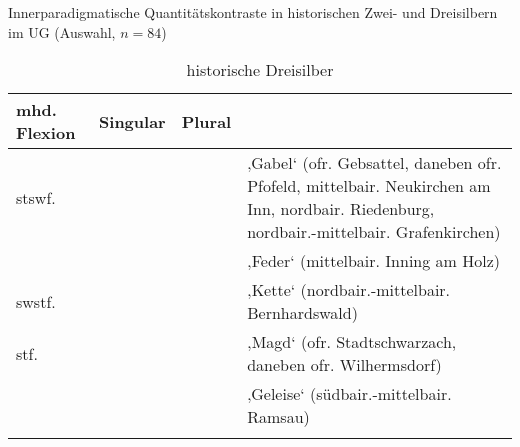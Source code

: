 \begin{table}[p]
\caption{Innerparadigmatische Quantitätskontraste in historischen Zwei- und Dreisilbern im UG (Auswahl, $n=84$)\label{tab:24}}
\begin{subtable}{\textwidth}
\caption{historische Dreisilber\label{tab:24a}}
\small
\begin{tabularx}{\textwidth}{lllQ}
\lsptoprule
mhd. Flexion & {Singular} & {Plural}  & \\\midrule
 stswf. &  &  &   ‚Gabel‘ (ofr. Gebsattel, daneben ofr. Pfofeld, mittelbair. Neukirchen am Inn, nordbair. Riedenburg, nordbair.-mittelbair. Grafenkirchen)\\
 \tablevspace
  &  &  &   ‚Feder‘ (mittelbair. Inning am Holz)\\
  \tablevspace
 swstf. &  &  &   ‚Kette‘ (nordbair.-mittelbair. Bernhardswald)\\
 \tablevspace
 stf. &  &  &   ‚Magd‘ (ofr. Stadtschwarzach, daneben ofr. Wilhermsdorf)\\
 \tablevspace
  &  &  &   ‚Geleise‘ (südbair.-mittelbair. Ramsau)\\
  \lspbottomrule
\end{tabularx}
\end{subtable}


\end{table}
